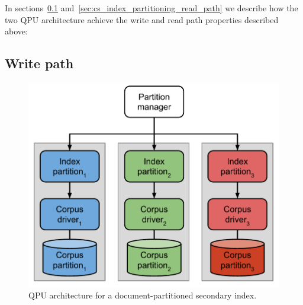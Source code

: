 In sections~\ref{sec:cs_index_partitioning_write_path} and~\ref{sec:cs_index_partitioning_read_path} we describe
how the two QPU architecture achieve the write and read path properties described above:

\subsection{Write path}
\label{sec:cs_index_partitioning_write_path}

\begin{figure}
  \begin{minipage}{.5\textwidth}
    \centering
    \includegraphics[scale=0.5]{./figures/case_studies/index_partitioned_by_document.pdf}
    \caption{QPU architecture for a document-partitioned secondary index.}
    \label{fig:index_partitioned_by_document}
  \end{minipage}%
  \begin{minipage}{.5\textwidth}
    \centering

\end{minipage}
\end{figure}
